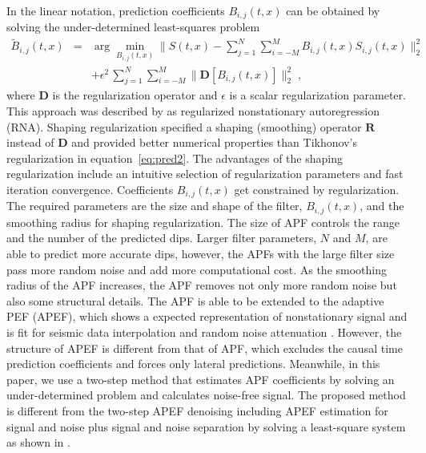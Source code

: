 In the linear notation, prediction coefficients $B_{i,j}(t,x)$ can be
obtained by solving the under-determined least-squares problem
{\setlength\arraycolsep{2pt}
\begin{eqnarray}
  \label{eq:pred2}
\tilde{B}_{i,j}(t,x) &=& \arg\min_{B_{i,j}(t,x)}\|S(t,x)-
  \sum_{j=1}^{N} \sum_{i=-M}^{M} B_{i,j}(t,x)S_{i,j}(t,x)\|_2^2 \nonumber \\
  & & + \epsilon^2\, \sum_{j=1}^{N} \sum_{i=-M}^{M} 
  \|\mathbf{D}[B_{i,j}(t,x)]\|_2^2\;,
\end{eqnarray}}
where $\mathbf{D}$ is the regularization operator and $\epsilon$ is a
scalar regularization parameter. This approach was described by
\cite{Fomel09} as regularized nonstationary autoregression (RNA). Shaping
regularization \cite[]{Fomel07} specified a shaping (smoothing)
operator $\mathbf{R}$ instead of $\mathbf{D}$ and provided better
numerical properties than Tikhonov's regularization
\cite[]{Tikhonov63} in equation~\ref{eq:pred2}. The advantages of 
the shaping regularization include an intuitive selection of
regularization parameters and fast iteration convergence. Coefficients
$B_{i,j}(t,x)$ get constrained by regularization. The required
parameters are the size and shape of the filter, $B_{i,j}(t,x)$, and
the smoothing radius for shaping regularization. The size of APF
controls the range and the number of the predicted dips. Larger filter
parameters, $N$ and $M$, are able to predict more accurate dips,
however, the APFs with the large filter size pass more random noise
and add more computational cost. As the smoothing radius of the APF
increases, the APF removes not only more random noise but also some
structural details. The APF is able to be extended to the adaptive PEF
(APEF), which shows a expected representation of nonstationary signal
and is fit for seismic data interpolation \cite[]{Liu11a} and random
noise attenuation \cite[]{Liu11b}. However, the structure of APEF is
different from that of APF, which excludes the causal time prediction
coefficients and forces only lateral predictions. Meanwhile, in this
paper, we use a two-step method that estimates APF coefficients by
solving an under-determined problem and calculates noise-free signal.
The proposed method is different from the two-step APEF denoising
including APEF estimation for signal and noise plus signal and noise
separation by solving a least-square system as shown in
\cite{Liu11b}.

